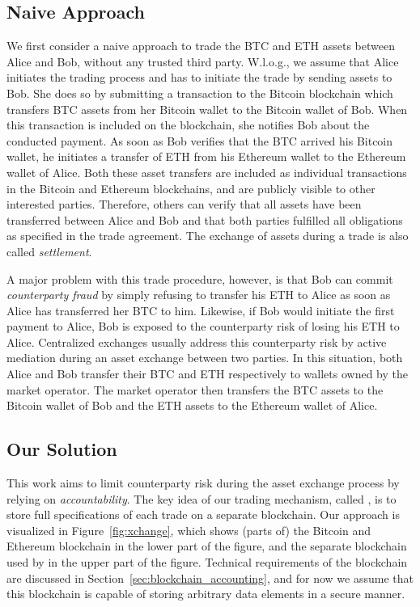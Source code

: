 \subsection{Naive Approach}
We first consider a naive approach to trade the BTC and ETH assets between Alice and Bob, without any trusted third party.
W.l.o.g., we assume that Alice initiates the trading process and has to initiate the trade by sending assets to Bob.
She does so by submitting a transaction to the Bitcoin blockchain which transfers BTC assets from her Bitcoin wallet to the Bitcoin wallet of Bob.
When this transaction is included on the blockchain, she notifies Bob about the conducted payment.
As soon as Bob verifies that the BTC arrived his Bitcoin wallet, he initiates a transfer of ETH from his Ethereum wallet to the Ethereum wallet of Alice.
Both these asset transfers are included as individual transactions in the Bitcoin and Ethereum blockchains, and are publicly visible to other interested parties.
Therefore, others can verify that all assets have been transferred between Alice and Bob and that both parties fulfilled all obligations as specified in the trade agreement.
The exchange of assets during a trade is also called \emph{settlement}.

A major problem with this trade procedure, however, is that Bob can commit \emph{counterparty fraud} by simply refusing to transfer his ETH to Alice as soon as Alice has transferred her BTC to him.
Likewise, if Bob would initiate the first payment to Alice, Bob is exposed to the counterparty risk of losing his ETH to Alice.
Centralized exchanges usually address this counterparty risk by active mediation during an asset exchange between two parties.
In this situation, both Alice and Bob transfer their BTC and ETH respectively to wallets owned by the market operator.
The market operator then transfers the BTC assets to the Bitcoin wallet of Bob and the ETH assets to the Ethereum wallet of Alice.

\subsection{Our Solution}
This work aims to limit counterparty risk during the asset exchange process by relying on \emph{accountability}.
The key idea of our trading mechanism, called \emph{\ModelName{}}, is to store full specifications of each trade on a separate blockchain.
Our approach is visualized in Figure~\ref{fig:xchange}, which shows (parts of) the Bitcoin and Ethereum blockchain in the lower part of the figure, and the separate blockchain used by \emph{\ModelName{}} in the upper part of the figure.
Technical requirements of the \ModelName{} blockchain are discussed in Section~\ref{sec:blockchain_accounting}, and for now we assume that this blockchain is capable of storing arbitrary data elements in a secure manner.

